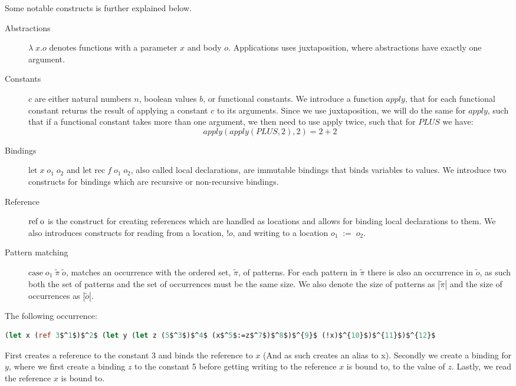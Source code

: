 \documentclass[../../master.tex]{subfiles}
\begin{document}
Some notable constructs is further explained below.
\begin{description}
	\item[Abstractions] $\lambda\;x.o$ denotes functions with a parameter $x$ and body $o$.
		Applications uses juxtaposition, where abstractions have exactly one argument.

	\item[Constants] $c$ are either natural numbers $n$, boolean values $b$, or functional constants.
		We introduce a function $apply$, that for each functional constant returns the result of applying a constant $c$ to its arguments.
		Since we use juxtaposition, we will do the same for $apply$, such that if a functional constant takes more than one argument, we then need to use apply twice, such that for $PLUS$ we have:
		$$apply(apply(PLUS,2),2)=2+2$$

	\item[Bindings] $\mbox{let} \; x \; o_1 \; o_2$ and $\mbox{let rec} \; f \; o_1 \; o_2$, also called local declarations, are immutable bindings that binds variables to values.
		We introduce two constructs for bindings which are recursive or non-recursive bindings.

	\item[Reference] $\mbox{ref\;o}$ is the construct for creating references which are handled as locations and allows for binding local declarations to them.
		We also introduces constructs for reading from a location, $!o$, and writing to a location $o_1\;:=\;o_2$.

	\item[Pattern matching] $\mbox{case} \; o_1 \; \tilde{\pi} \; \tilde{o}$, matches an occurrence with the ordered set, $\tilde{\pi}$, of patterns.
		For each pattern in $\tilde{\pi}$ there is also an occurrence in $\tilde{o}$, as such both the set of patterns and the set of occurrences must be the same size.
		We also denote the size of patterns as $|\tilde{\pi}|$ and the size of occurrences as $|\tilde{o}|$.
\end{description}

\begin{example}[]\label{ex:write}
The following occurrence:
\begin{lstlisting}[language=Caml, mathescape=true]
(let x (ref 3$^1$)$^2$ (let y (let z (5$^3$)$^4$ (x$^5$:=z$^7$)$^8$)$^{9}$ (!x)$^{10}$)$^{11}$)$^{12}$
\end{lstlisting}
First creates a reference to the constant 3 and binds the reference to $x$ (And as such creates an alias to x).
Secondly we create a binding for $y$, where we first create a binding $z$ to the constant 5 before getting writing to the reference $x$ is bound to, to the value of $z$.
Lastly, we read the reference $x$ is bound to.
\end{example}
\end{document}
